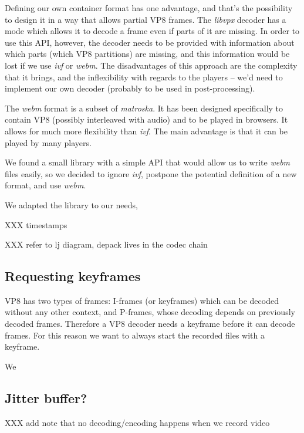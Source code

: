 \documentclass[twoside,openright,a4paper,12pt,english]{article}
\begin{document}
Defining our own container format has one advantage, and that's the possibility
to design it in a way that allows partial VP8 frames. The \emph{libvpx} decoder
has a mode which allows it to decode a frame even if parts of it are missing.
In order to use this API, however, the decoder needs to be provided with
information about which parts (which VP8 partitions) are missing, and this
information would be lost if we use \emph{ivf} or \emph{webm}. The
disadvantages of this approach are the complexity that it brings, and the
inflexibility with regards to the players -- we'd need to implement our own
decoder (probably to be used in post-processing).

The \emph{webm}\cite{webm} format is a subset of
\emph{matroska}\cite{matroska}. It has been designed
specifically to contain VP8 (possibly interleaved with audio) and to be played
in browsers. It allows for much more flexibility than \emph{ivf}. The main advantage
is that it can be played by many players.

\smallskip
We found a small library with a simple API that would allow us to write \emph{webm} files
easily, so we decided to ignore \emph{ivf}, postpone the potential
definition of a new format, and use \emph{webm}. 

We adapted the library to our needs, 

XXX timestamps

XXX refer to lj diagram, depack lives in the codec chain

\subsection{Requesting keyframes}
VP8 has two types of frames: I-frames (or keyframes) which can be decoded
without any other context, and P-frames, whose decoding depends on previously
decoded frames. Therefore a VP8 decoder needs a keyframe before it can decode
frames. For this reason we want to always start the recorded files with a
keyframe.

We 

\subsection{Jitter buffer?}
\label{video-jb}




XXX add note that no decoding/encoding happens when we record video
\end{document}
